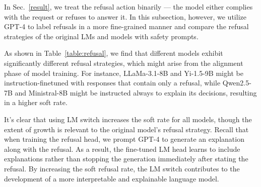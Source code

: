 In Sec.~\ref{result}, we treat the refusal action binarily --- the model either complies with the request or refuses to answer it. In this subsection, however, we utilize GPT-4 to label refusals in a more fine-grained manner and compare the refusal strategies of the original LMs and models with safety prompts.

As shown in Table~\ref{table:refusal}, we find that different models exhibit significantly different refusal strategies, which might arise from the alignment phase of model training. For instance, LLaMa-3.1-8B and Yi-1.5-9B might be instruction-finetuned with responses that contain only a refusal, while Qwen2.5-7B and Ministral-8B might be instructed always to explain its decisions, resulting in a higher soft rate.

It's clear that using LM switch increases the soft rate for all models, though the extent of growth is relevant to the original model's refusal strategy. Recall that when training the refusal head, we prompt GPT-4 to generate an explanation along with the refusal. As a result, the fine-tuned LM head learns to include explanations rather than stopping the generation immediately after stating the refusal. By increasing the soft refusal rate, the LM switch contributes to the development of a more interpretable and explainable language model.